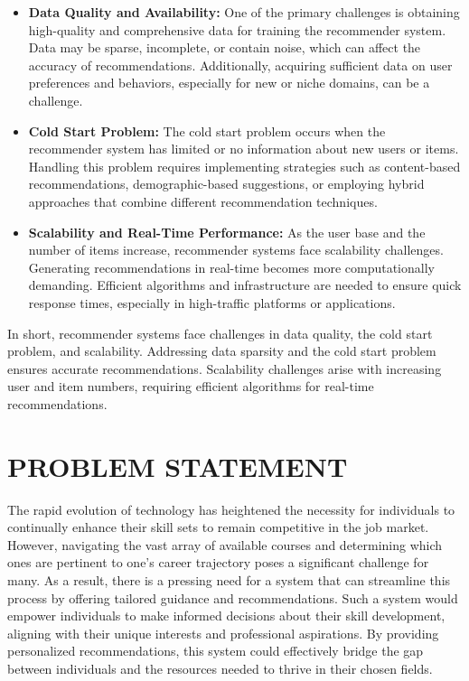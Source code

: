 \begin{itemize}
    \item \textbf{Data Quality and Availability:} One of the primary challenges is
        obtaining high-quality and comprehensive data for training the recommender
        system. Data may be sparse, incomplete, or contain noise, which can affect
        the accuracy of recommendations. Additionally, acquiring sufficient data on
        user preferences and behaviors, especially for new or niche domains, can be
        a challenge.

    \item \textbf{Cold Start Problem:} The cold start problem occurs when the
        recommender system has limited or no information about new users or items. Handling
        this problem requires implementing strategies such as content-based recommendations,
        demographic-based suggestions, or employing hybrid approaches that combine different
        recommendation techniques.

    \item \textbf{Scalability and Real-Time Performance:} As the user base and the
        number of items increase, recommender systems face scalability challenges.
        Generating recommendations in real-time becomes more computationally
        demanding. Efficient algorithms and infrastructure are needed to ensure quick
        response times, especially in high-traffic platforms or applications.
\end{itemize}

In short, recommender systems face challenges in data quality, the cold start problem,
and scalability. Addressing data sparsity and the cold start problem ensures accurate
recommendations. Scalability challenges arise with increasing user and item
numbers, requiring efficient algorithms for real-time recommendations.

\section{\uppercase{Problem Statement}}
The rapid evolution of technology has heightened the necessity for individuals to
continually enhance their skill sets to remain competitive in the job market.
However, navigating the vast array of available courses and determining which ones
are pertinent to one's career trajectory poses a significant challenge for many.
As a result, there is a pressing need for a system that can streamline this process
by offering tailored guidance and recommendations. Such a system would empower
individuals to make informed decisions about their skill development, aligning with
their unique interests and professional aspirations. By providing personalized
recommendations, this system could effectively bridge the gap between individuals
and the resources needed to thrive in their chosen fields.

